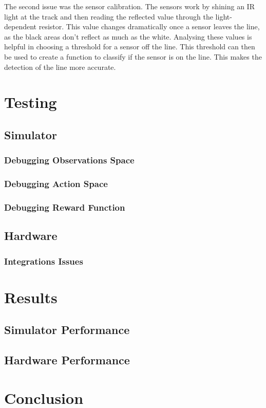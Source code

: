 \documentclass[12pt]{article}
\begin{document}
The second issue was the sensor calibration. The sensors work by shining an IR light at the track and then reading the reflected value through the light-dependent resistor. This value changes dramatically once a sensor leaves the line, as the black areas don't reflect as much as the white. Analysing these values is helpful in choosing a threshold for a sensor off the line. This threshold can then be used to create a function to classify if the sensor is on the line. This makes the detection of the line more accurate. 

\section{Testing}

\subsection{Simulator}
\subsubsection{Debugging Observations Space}
\subsubsection{Debugging Action Space}
\subsubsection{Debugging Reward Function}


\subsection{Hardware}
\subsubsection{Integrations Issues}


\section{Results}

\subsection{Simulator Performance}
\subsection{Hardware Performance}


\section{Conclusion}

\pagebreak

\printbibliography
\end{document}
